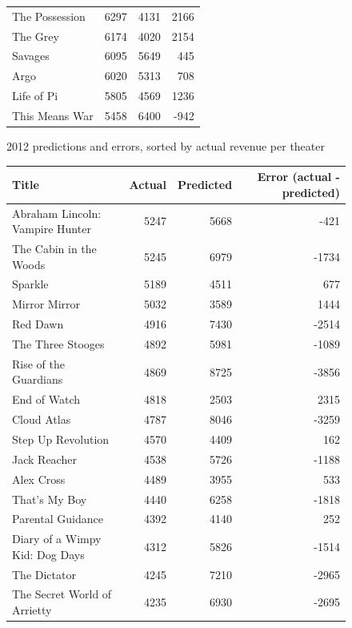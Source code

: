 \documentclass[10pt]{article}
\begin{document}
\begin{figure}[ht]
\begin{tabular}{l|r|r|r}
            The Possession & 6297 & 4131 & 2166 \\
            The Grey & 6174 & 4020 & 2154 \\
            Savages & 6095 & 5649 & 445 \\
            Argo & 6020 & 5313 & 708 \\
            Life of Pi & 5805 & 4569 & 1236 \\
            This Means War & 5458 & 6400 & -942 \\
            \hline
        \end{tabular}
        \caption{2012 predictions and errors, sorted by actual revenue per theater}
    \end{figure}
    
    \begin{figure}[ht]
        \scriptsize
        \centering
        \begin{tabular}{l|r|r|r}
            Title & Actual & Predicted & Error (actual - predicted) \\
            \hline
            Abraham Lincoln: Vampire Hunter & 5247 & 5668 & -421 \\
            The Cabin in the Woods & 5245 & 6979 & -1734 \\
            Sparkle & 5189 & 4511 & 677 \\
            Mirror Mirror & 5032 & 3589 & 1444 \\
            Red Dawn & 4916 & 7430 & -2514 \\
            The Three Stooges & 4892 & 5981 & -1089 \\
            Rise of the Guardians & 4869 & 8725 & -3856 \\
            End of Watch & 4818 & 2503 & 2315 \\
            Cloud Atlas & 4787 & 8046 & -3259 \\
            Step Up Revolution & 4570 & 4409 & 162 \\
            Jack Reacher & 4538 & 5726 & -1188 \\
            Alex Cross & 4489 & 3955 & 533 \\
            That's My Boy & 4440 & 6258 & -1818 \\
            Parental Guidance & 4392 & 4140 & 252 \\
            Diary of a Wimpy Kid: Dog Days & 4312 & 5826 & -1514 \\
            The Dictator & 4245 & 7210 & -2965 \\
            The Secret World of Arrietty & 4235 & 6930 & -2695 \\

\end{tabular}
\end{figure}
\end{document}
